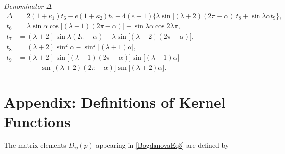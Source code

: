 \emph{Denominator \(\Delta\)}
\[
\begin{aligned}
	\Delta
	&= 2(1+\kappa_1)t_6
	-e(1+\kappa_2)t_7
	+4(e-1)\bigl\{\lambda\sin \bigl[(\lambda+2)(2\pi-\alpha)\bigr] t_8
	+\sin\lambda\alpha t_9\bigr\},\\
	t_6 &= \lambda\sin\alpha\cos \bigl[(\lambda+1)(2\pi-\alpha)\bigr]
	-\sin\lambda\alpha\cos 2\lambda\pi,\\
	t_7 &= (\lambda+2)\sin\lambda(2\pi-\alpha)
	-\lambda\sin \bigl[(\lambda+2)(2\pi-\alpha)\bigr],\\
	t_8 &= (\lambda+2)\sin^{2}\alpha-\sin^{2}\bigl[(\lambda+1)\alpha\bigr],\\
	t_9 &= (\lambda+2)\sin \bigl[(\lambda+1)(2\pi-\alpha)\bigr]
	\sin \bigl[(\lambda+1)\alpha\bigr]\\
	&\qquad
	-\sin \bigl[(\lambda+2)(2\pi-\alpha)\bigr]
	\sin \bigl[(\lambda+2)\alpha\bigr].
\end{aligned}
\]

\appendix
\section{Appendix: Definitions of Kernel Functions}
\label{BogdanovaAppB}

The matrix elements $D_{ij}(p)$ appearing in \eqref{BogdanovaEq8} are defined by

